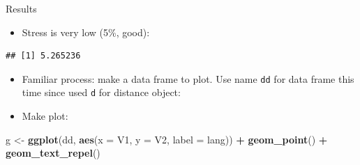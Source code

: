 \documentclass[ignorenonframetext,]{beamer}
\newenvironment{Shaded}{\begin{snugshade}}{\end{snugshade}}
\newcommand{\DataTypeTok}[1]{\textcolor[rgb]{0.13,0.29,0.53}{#1}}
\newcommand{\KeywordTok}[1]{\textcolor[rgb]{0.13,0.29,0.53}{\textbf{#1}}}
\newcommand{\NormalTok}[1]{#1}
\newcommand{\OperatorTok}[1]{\textcolor[rgb]{0.81,0.36,0.00}{\textbf{#1}}}
\newcommand{\StringTok}[1]{\textcolor[rgb]{0.31,0.60,0.02}{#1}}
\providecommand{\tightlist}{%
  \setlength{\itemsep}{0pt}\setlength{\parskip}{0pt}}
\begin{document}
\begin{frame}[fragile]{Results}
\protect\hypertarget{results-3}{}

\begin{itemize}
\tightlist
\item
  Stress is very low (5\%, good):
\end{itemize}

\begin{Shaded}
\end{Shaded}

\begin{verbatim}
## [1] 5.265236
\end{verbatim}

\begin{itemize}
\tightlist
\item
  Familiar process: make a data frame to plot. Use name \texttt{dd} for
  data frame this time since used \texttt{d} for distance object:
\end{itemize}

\begin{Shaded}
\end{Shaded}

\begin{itemize}
\tightlist
\item
  Make plot:
\end{itemize}

\begin{Shaded}
\begin{Highlighting}[]
\NormalTok{g <-}\StringTok{ }\KeywordTok{ggplot}\NormalTok{(dd, }\KeywordTok{aes}\NormalTok{(}\DataTypeTok{x =}\NormalTok{ V1, }\DataTypeTok{y =}\NormalTok{ V2, }\DataTypeTok{label =}\NormalTok{ lang)) }\OperatorTok{+}
\StringTok{  }\KeywordTok{geom_point}\NormalTok{() }\OperatorTok{+}\StringTok{ }\KeywordTok{geom_text_repel}\NormalTok{()}
\end{Highlighting}
\end{Shaded}

\end{frame}
\end{document}

